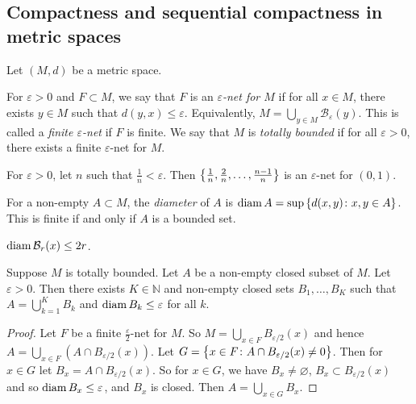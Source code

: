 \subsection{Compactness and sequential compactness in metric spaces}
Let \( (M, d) \) be a metric space.
\begin{definition}
	For \( \varepsilon > 0 \) and \( F \subset M \), we say that \( F \) is an \textit{\( \varepsilon \)-net for \( M \)} if for all \( x \in M \), there exists \( y \in M \) such that \( d(y,x) \leq \varepsilon \).
	Equivalently, \( M = \bigcup_{y \in M} \mathcal B_\varepsilon(y) \).
	This is called a \textit{finite \( \varepsilon \)-net} if \( F \) is finite.
	We say that \( M \) is \textit{totally bounded} if for all \( \varepsilon > 0 \), there exists a finite \( \varepsilon \)-net for \( M \).
\end{definition}
\begin{example}
	For \( \varepsilon > 0 \), let \( n \) such that \( \frac{1}{n} < \varepsilon \).
	Then \( \qty{\frac{1}{n}, \frac{2}{n}, \dots, \frac{n-1}{n}} \) is an \( \varepsilon \)-net for \( (0,1) \).
\end{example}
\begin{definition}
	For a non-empty \( A \subset M \), the \textit{diameter} of \( A \) is \( \operatorname{diam} A = \sup\qty{d(x,y) \colon x,y \in A} \).
	This is finite if and only if \( A \) is a bounded set.
\end{definition}
\begin{example}
	\( \operatorname{diam} \mathcal B_r(x) \leq 2r \).
\end{example}
\begin{lemma}
	Suppose \( M \) is totally bounded.
	Let \( A \) be a non-empty closed subset of \( M \).
	Let \( \varepsilon > 0 \).
	Then there exists \( K \in \mathbb N \) and non-empty closed sets \( B_1, \dots, B_K \) such that \( A = \bigcup_{k=1}^K B_k \) and \( \operatorname{diam} B_k \leq \varepsilon \) for all \( k \).
\end{lemma}
\begin{proof}
	Let \( F \) be a finite \( \frac{\varepsilon}{2} \)-net for \( M \).
	So \( M = \bigcup_{x \in F} B_{\varepsilon/2}(x) \) and hence \( A = \bigcup_{x \in F} (A \cap B_{\varepsilon/2}(x)) \).
	Let \( G = \qty{ x \in F \colon A \cap B_{\varepsilon / 2}(x) \neq 0 } \).
	Then for \( x \in G \) let \( B_x = A \cap B_{\varepsilon / 2}(x) \).
	So for \( x \in G \), we have \( B_x \neq \varnothing \), \( B_x \subset B_{\varepsilon/2}(x) \) and so \( \operatorname{diam} B_x \leq \varepsilon \), and \( B_x \) is closed.
	Then \( A = \bigcup_{x \in G} B_x \).
\end{proof}
